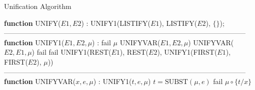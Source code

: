 \begin{itemize}
          \begin{algorithm}
              \caption{Unification Algorithm}
              \begin{algorithmic}[1]
                  \label{alg:unification_algorithm}
                  \STATE \textbf{function} UNIFY($E1, E2$) :
                  \RETURN UNIFY1(LISTIFY($E1$), LISTIFY($E2$), $\{\}$);
                  \STATE
                  --------------------------------------------------------------------------------------------------------
                  \STATE
                  \STATE \textbf{function} UNIFY1($E1, E2, \mu$) :
                  \RETURN fail
                  \ENDIF
                  \RETURN $\mu$
                  \ENDIF
                  \RETURN UNIFYVAR($E1, E2, \mu$)\ENDIF
                  \RETURN UNIFYVAR($E2, E1, \mu$)
                  \ENDIF
                  \RETURN fail
                  \ENDIF
                  \RETURN fail
                  \ENDIF
                  \RETURN UNIFY1(REST($E1$), REST($E2$), UNIFY1(FIRST($E1$), FIRST($E2$), $\mu$))
                  \STATE
                  --------------------------------------------------------------------------------------------------------
                  \STATE
                  \STATE \textbf{function} UNIFYVAR($x, e, \mu$) :
                  \RETURN UNIFY1($t, e, \mu$)
                  \ENDIF
                  \STATE $t = \text{SUBST}(\mu, e)$
                  \RETURN fail
                  \ELSE
                  \RETURN $\mu \circ \{t/x\}$
                  \ENDIF
              \end{algorithmic}
          \end{algorithm}

\end{itemize}


